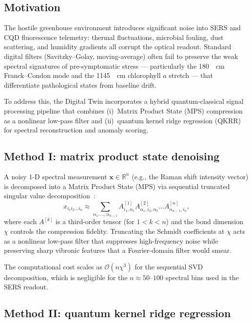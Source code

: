 \documentclass[11pt,a4paper]{article}
\begin{document}
\subsection{Motivation}

The hostile greenhouse environment introduces significant noise into SERS and CQD fluorescence telemetry: thermal fluctuations, microbial fouling, dust scattering, and humidity gradients all corrupt the optical readout. Standard digital filters (Savitzky--Golay, moving-average) often fail to preserve the weak spectral signatures of pre-symptomatic stress --- particularly the \qty{180}{\per\cm} Franck--Condon mode and the \qty{1145}{\per\cm} chlorophyll $a$  stretch --- that differentiate pathological states from baseline drift.

To address this, the Digital Twin incorporates a hybrid quantum-classical signal processing pipeline that combines (i)~Matrix Product State (MPS) compression as a nonlinear low-pass filter and (ii)~quantum kernel ridge regression (QKRR) for spectral reconstruction and anomaly scoring.

\subsection{Method I: matrix product state denoising}

A noisy 1-D spectral measurement $\mathbf{x} \in \mathbb{R}^n$ (e.g., the Raman shift intensity vector) is decomposed into a Matrix Product State (MPS) via sequential truncated singular value decomposition~\cite{Stoudenmire2016}:
\begin{equation}\label{eq:SI_mps_decomp}
x_{i_1 i_2 \dots i_n} \approx \sum_{\alpha_1,\dots,\alpha_{n-1}} A^{[1]}_{i_1,\alpha_1} A^{[2]}_{\alpha_1,i_2,\alpha_2} \dots A^{[n]}_{\alpha_{n-1},i_n},
\end{equation}
where each $A^{[k]}$ is a third-order tensor (for $1<k<n$) and the bond dimension $\chi$ controls the compression fidelity. Truncating the Schmidt coefficients at $\chi$ acts as a nonlinear low-pass filter that suppresses high-frequency noise while preserving sharp vibronic features that a Fourier-domain filter would smear.

The computational cost scales as $\mathcal{O}(n \chi^3)$ for the sequential SVD decomposition, which is negligible for the $n \approx 50$--$100$ spectral bins used in the SERS readout.

\subsection{Method II: quantum kernel ridge regression}
\end{document}
